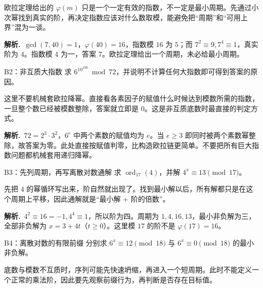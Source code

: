 \documentclass[UTF8,a4paper,11pt,twoside,openright,fontset=fandol]{ctexbook}
\theoremstyle{definition}
\newcommand{\ord}{\operatorname{ord}}
\newcommand{\sol}{\par\noindent\textbf{解析.}\ }
\begin{document}
\begin{pitfall}[讲解：先看这题到底在做什么]
欧拉定理给出的 $\varphi(m)$ 只是一个一定有效的指数，不一定是最小周期。先通过小次幂找到真实的阶，再决定指数应该对什么数取模，能避免把“周期”和“可用上界”混为一谈。
\end{pitfall}

\sol $\gcd(7,40)=1$，$\varphi(40)=16$，指数模 $16$ 为 $5$；而 $7^2\equiv9,7^4\equiv1$，真实阶为 $4$。指数模 $4$ 为一，答案 $7$。欧拉定理给出一个周期，未必给最小周期。


\begin{problem}{B2：非互质大指数}
求 $6^{10^{100}}\bmod72$，并说明不计算任何大指数即可得到答案的原因。
\end{problem}

\begin{pitfall}[讲解：先看这题到底在做什么]
这里不要机械套欧拉降幂。直接看各素因子的赋值什么时候达到模数所需的指数，一旦整个数已经被模数整除，答案就立即是 $0$。这是非互质底数时最直接的判定方式。
\end{pitfall}

\sol $72=2^3\cdot3^2$，$6^e$ 中两个素数的赋值均为 $e$。当 $e\ge3$ 即同时被两个素数幂整除，故答案为零。此处直接按赋值判零，比构造欧拉链更简单。不要把所有巨大指数问题都机械套用递归降幂。


\begin{problem}{B3：先列周期，再写离散对数通解}
求 $\ord_{17}(4)$，并解 $4^x\equiv13\pmod{17}$。
\end{problem}

\begin{pitfall}[讲解：先看这题到底在做什么]
先把 $4$ 的幂循环写出来，阶自然就出现了。找到最小解以后，所有解都只是在这个周期上平移，因此通解就是“最小解 + 阶的倍数”。
\end{pitfall}

\sol $4^2\equiv16=-1,4^4\equiv1$，所以阶为四。周期为 $1,4,16,13$，最小非负解为三，全部非负解为 $x=3+4t$（$t\ge0$）。这里模 $17$ 的阶不是 $\varphi(17)=16$。


\begin{problem}{B4：离散对数的有限前缀}
分别求 $6^x\equiv12\pmod{18}$ 与 $6^x\equiv0\pmod{18}$ 的最小非负解。
\end{problem}

\begin{pitfall}[讲解：先看这题到底在做什么]
底数与模数不互质时，序列可能先快速坍缩，再进入一个短周期。此时不能定义一个正常的乘法阶，因此要先观察前缀行为，再判断是否存在目标值。
\end{pitfall}
\end{document}
